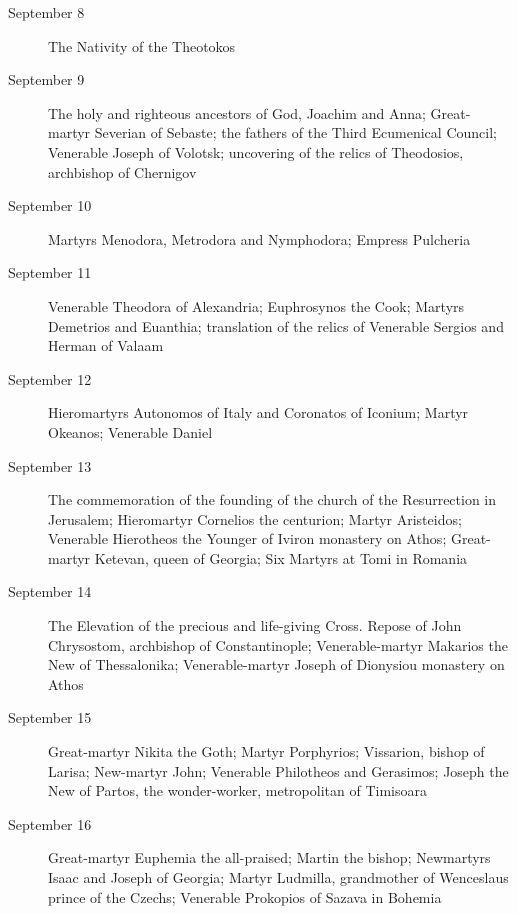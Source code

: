 \begin{description}
\item[September 8]

The Nativity of the Theotokos
\item[September 9]

The holy and righteous ancestors of God, Joachim and Anna; Great-martyr Severian of Sebaste; the fathers of the Third Ecumenical Council; Venerable Joseph of Volotsk; uncovering of the relics of Theodosios, archbishop of Chernigov

\item[September 10]

Martyrs Menodora, Metrodora and Nymphodora; Empress Pulcheria

\item[September 11]

Venerable Theodora of Alexandria; Euphrosynos the Cook; Martyrs Demetrios and Euanthia; translation of the relics of Venerable Sergios and Herman of Valaam

\item[September 12]

Hieromartyrs Autonomos of Italy and Coronatos of Iconium; Martyr Okeanos; Venerable Daniel

\item[September 13]

The commemoration of the founding of the church of the Resurrection in Jerusalem; Hieromartyr Cornelios the centurion; Martyr Aristeidos; Venerable Hierotheos the Younger of Iviron monastery on Athos; Great-martyr Ketevan, queen of Georgia; Six Martyrs at Tomi in Romania

\item[September 14]

The Elevation of the precious and life-giving Cross. Repose of John Chrysostom, archbishop of Constantinople; Venerable-martyr Makarios the New of Thessalonika; Venerable-martyr Joseph of Dionysiou monastery on Athos

\item[September 15]

Great-martyr Nikita the Goth; Martyr Porphyrios; Vissarion, bishop of Larisa; New-martyr John; Venerable Philotheos and Gerasimos; Joseph the New of Partos, the wonder-worker, metropolitan of Timisoara

\item[September 16]

Great-martyr Euphemia the all-praised; Martin the bishop; Newmartyrs Isaac and Joseph of Georgia; Martyr Ludmilla, grandmother of Wenceslaus prince of the Czechs; Venerable Prokopios of Sazava in Bohemia


\end{description}
